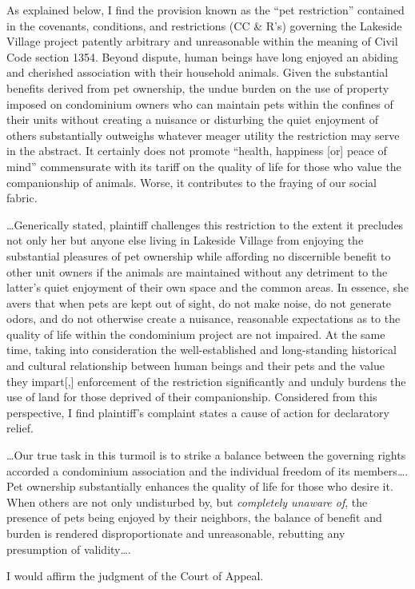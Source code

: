 As explained below, I find the provision known as the ``pet restriction''
contained in the covenants, conditions, and restrictions (CC \& R's) governing
the Lakeside Village project patently arbitrary and unreasonable within the
meaning of Civil Code section 1354. Beyond dispute, human beings have long
enjoyed an abiding and cherished association with their household animals. Given
the substantial benefits derived from pet ownership, the undue burden on the use
of property imposed on condominium owners who can maintain pets within the
confines of their units without creating a nuisance or disturbing the quiet
enjoyment of others substantially outweighs whatever meager utility the
restriction may serve in the abstract. It certainly does not promote ``health,
happiness [or] peace of mind'' commensurate with its tariff on the quality of
life for those who value the companionship of animals. Worse, it contributes to
the fraying of our social fabric.

\ldots Generically stated, plaintiff challenges this restriction to the extent
it precludes not only her but anyone else living in Lakeside Village from
enjoying the substantial pleasures of pet ownership while affording no
discernible benefit to other unit owners if the animals are maintained without
any detriment to the latter's quiet enjoyment of their own space and the common
areas. In essence, she avers that when pets are kept out of sight, do not make
noise, do not generate odors, and do not otherwise create a nuisance, reasonable
expectations as to the quality of life within the condominium project are not
impaired. At the same time, taking into consideration the well-established and
long-standing historical and cultural relationship between human beings and
their pets and the value they impart[,] enforcement of the restriction
significantly and unduly burdens the use of land for those deprived of their
companionship. Considered from this perspective, I find plaintiff's complaint
states a cause of action for declaratory relief.

\ldots Our true task in this turmoil is to strike a balance
between the governing rights accorded a condominium association and the
individual freedom of its members\ldots . Pet ownership substantially enhances
the quality of life for those who desire it. When others are not only
undisturbed by, but \textit{completely unaware of}, the presence of pets being
enjoyed by their neighbors, the balance of benefit and burden is rendered
disproportionate and unreasonable, rebutting any presumption of validity\ldots .

I would affirm the judgment of the Court of Appeal.

